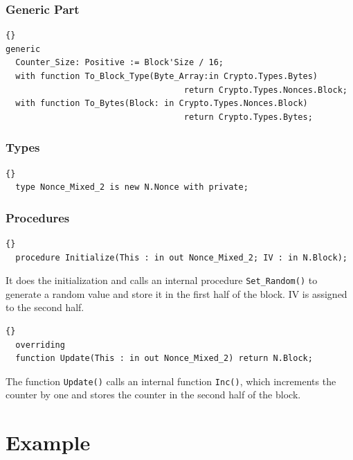 
\subsubsection*{Generic Part}
\begin{lstlisting}{}
generic
  Counter_Size: Positive := Block'Size / 16;
  with function To_Block_Type(Byte_Array:in Crypto.Types.Bytes)
    								return Crypto.Types.Nonces.Block;
  with function To_Bytes(Block: in Crypto.Types.Nonces.Block)
    								return Crypto.Types.Bytes;
\end{lstlisting}


\subsubsection*{Types}
\begin{lstlisting}{}
  type Nonce_Mixed_2 is new N.Nonce with private;
\end{lstlisting}


\subsubsection*{Procedures}
\begin{lstlisting}{}
  procedure Initialize(This : in out Nonce_Mixed_2; IV : in N.Block);
\end{lstlisting}
It does the initialization and calls an internal procedure
\texttt{Set\_Random()} to generate a random value and store it in the
first half of the block. IV is assigned to the second half.

\hhline
\begin{lstlisting}{}
  overriding
  function Update(This : in out Nonce_Mixed_2) return N.Block;
\end{lstlisting}
The function \texttt{Update()} calls an internal function
\texttt{Inc()}, which increments the counter by one and stores the
counter in the second half of the block.

\newpage
\section{Example}

